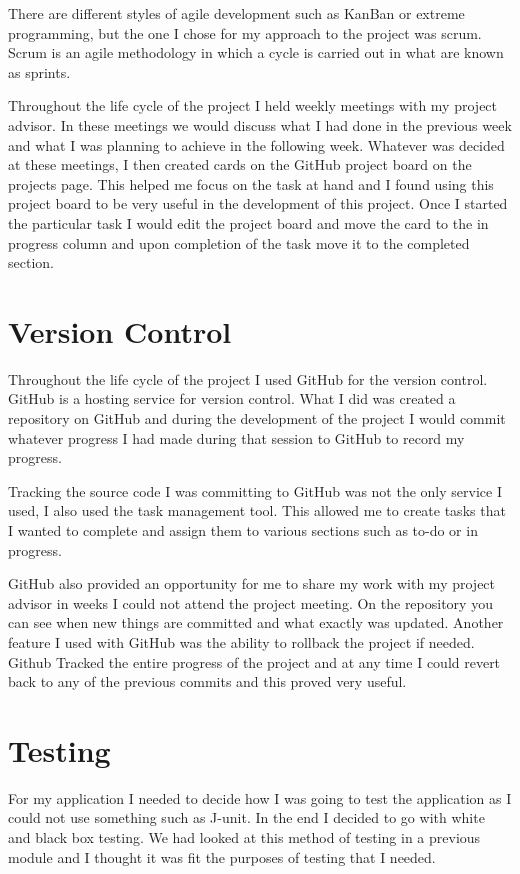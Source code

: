 There are different styles of agile development such as KanBan or extreme programming, but the one I chose for my approach to the project was scrum. Scrum is an agile methodology in which a cycle is carried out in what are known as sprints. 

Throughout the life cycle of the project I held weekly meetings with my project advisor. In these meetings we would discuss what I had done in the previous week and what I was planning to achieve in the following week. Whatever was decided at these meetings, I then created cards on the GitHub project board on the projects page. This helped me focus on the task at hand and I found using this project board to be very useful in the development of this project. Once I started the particular task I would edit the project board and move the card to the in progress column and upon completion of the task move it to the completed section.  

\section{Version Control}
Throughout the life cycle of the project I used GitHub for the version control. GitHub is a hosting service for version control. What I did was created a repository on GitHub and during the development of the project I would commit whatever progress I had made during that session to GitHub to record my progress. 

Tracking the source code I was committing to GitHub was not the only service I used, I also used the task management tool. This allowed me to create tasks that I wanted to complete and assign them to various sections such as to-do or in progress. 

GitHub also provided an opportunity for me to share my work with my project advisor in weeks I could not attend the project meeting. On the repository you can see when new things are committed and what exactly was updated. Another feature I used with GitHub was the ability to rollback the project if needed. Github Tracked the entire progress of the project and at any time I could revert back to any of the previous commits and this proved very useful.

\section{Testing}
For my application I needed to decide how I was going to test the application as I could not use something such as J-unit. In the end I decided to go with white and black box testing. We had looked at this method of testing in a previous module and I thought it was fit the purposes  of testing that I needed.


